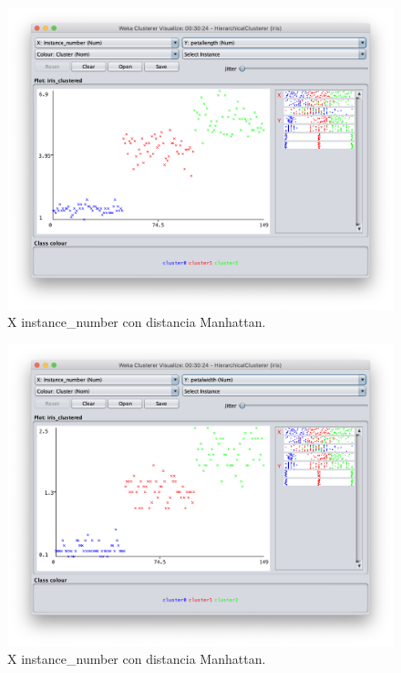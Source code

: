 \documentclass[11pt]{exam}
\begin{document}
\begin{questions}
\begin{figure}[h]
	\centering
	\includegraphics[scale=0.4]{hc_petallenght.png}
	\caption{X instance\_number con distancia Manhattan.}
	\label{Captura_7}
\end{figure}

\begin{figure}[h]
	\centering
	\includegraphics[scale=0.4]{hc_petalwidth.png}
	\caption{X instance\_number con distancia Manhattan.}
	\label{Captura_8}
\end{figure}



\end{questions}
\end{document}
